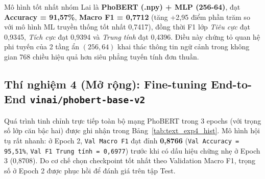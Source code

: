 \documentclass[12pt,a4paper]{article}
\begin{document}
\begin{table}[htbp]
\centering
\caption{Kết quả Thí nghiệm 3 — Pipeline Lai sử dụng PhoBERT Embeddings (\texttt{.npy})}
\label{tab:text_exp3}
\scriptsize
\setlength{\tabcolsep}{4pt}
\end{table}

Mô hình tốt nhất nhóm Lai là \textbf{PhoBERT (.npy) + MLP (256-64)}, đạt \textbf{Accuracy = 91,57\%}, \textbf{Macro F1 = 0,7712} (tăng +2,95 điểm phần trăm so với mô hình ML truyền thống tốt nhất 0,7417), đồng thời F1 lớp \textit{Tiêu cực} đạt 0,9345, \textit{Tích cực} đạt 0,9394 và \textit{Trung tính} đạt 0,4396. Điều này chứng tỏ quan hệ phi tuyến của 2 tầng ẩn $(256, 64)$ khai thác thông tin ngữ cảnh trong không gian 768 chiều hiệu quả hơn siêu phẳng tuyến tính đơn thuần.

\subsection{Thí nghiệm 4 (Mở rộng): Fine-tuning End-to-End \texttt{vinai/phobert-base-v2}}
Quá trình tinh chỉnh trực tiếp toàn bộ mạng PhoBERT trong 3 epochs (với trọng số lớp căn bậc hai) được ghi nhận trong Bảng~\ref{tab:text_exp4_hist}. Mô hình hội tụ rất nhanh: ở Epoch 2, \texttt{Val Macro F1} đạt đỉnh \textbf{0,8766} (\texttt{Val Accuracy = 95,51\%}, \texttt{Val F1 Trung tính = 0,6977}) trước khi có dấu hiệu chững nhẹ ở Epoch 3 (0,8708). Do cơ chế chọn checkpoint tốt nhất theo Validation Macro F1, trọng số ở Epoch 2 được phục hồi để đánh giá trên tập Test.
\end{document}
